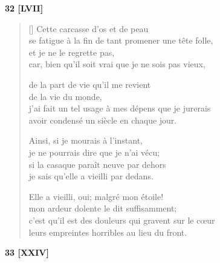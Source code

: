 \documentclass[a4paper,12pt]{book}
\begin{document}
\begin{center}
  \textbf{32 [LVII]}
\end{center}

\settowidth{\versewidth}{horribles gravent sur le cœur, si ce n'est au front.}

\begin{verse}[\versewidth]
  Cette carcasse d'os et de peau \\
  se fatigue à la fin de tant promener une tête folle, \\
  et je ne le regrette pas, \\
  car, bien qu'il soit vrai que je ne sois pas vieux,

  de la part de vie qu'il me revient \\
  de la vie du monde, \\
  j'ai fait un tel usage à mes dépens que je jurerais \\
  avoir condensé un siècle en chaque jour.

  Ainsi, si je mourais à l'instant, \\
  je ne pourrais dire que je n'ai vécu; \\
  si la casaque paraît neuve par dehors \\
  je sais qu'elle a vieilli par dedans.

  Elle a vieilli, oui; malgré mon étoile! \\
  mon ardeur dolente le dit suffisamment; \\
  c'est qu'il est des douleurs qui gravent sur le cœur \\
  leurs empreintes horribles au lieu du front.
\end{verse}

\bigskip

\begin{center}
  \textbf{33 [XXIV]}
\end{center}

\settowidth{\versewidth}{deux baisers qui à l'unisson éclatent,}
\end{document}

